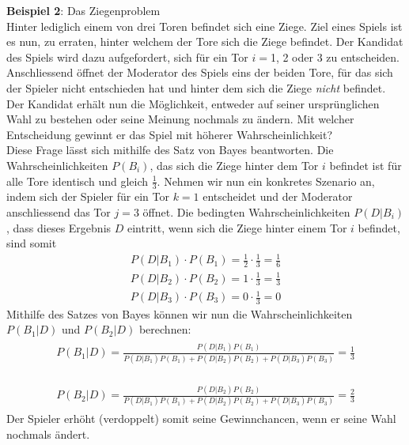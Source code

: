 \begin{center}
\begin{tcolorbox}[enhanced,width=6in, drop fuzzy shadow southwest,
colframe=blue!50!black,colback=blue!01]
\textbf{Beispiel 2}: Das Ziegenproblem \\

Hinter lediglich einem von drei Toren befindet sich eine Ziege. Ziel eines Spiels ist es nun, zu erraten, hinter welchem der Tore sich die Ziege befindet. Der Kandidat des Spiels wird dazu aufgefordert, sich für ein Tor $i=$1, 2 oder 3 zu entscheiden. Anschliessend öffnet der Moderator des Spiels eins der beiden Tore, für das sich der Spieler nicht entschieden hat und hinter dem sich die Ziege \textit{nicht} befindet. Der Kandidat erhält nun die Möglichkeit, entweder auf seiner ursprünglichen Wahl zu bestehen oder seine Meinung nochmals zu ändern. Mit welcher Entscheidung gewinnt er das Spiel mit höherer Wahrscheinlichkeit? \\

Diese Frage lässt sich mithilfe des Satz von Bayes beantworten. Die Wahrscheinlichkeiten $P(B_i)$, das sich die Ziege hinter dem Tor $i$ befindet ist für alle Tore identisch und gleich $\frac{1}{3}$. Nehmen wir nun ein konkretes Szenario an, indem sich der Spieler für ein Tor $k=1$ entscheidet und der Moderator anschliessend das Tor $j=3$ öffnet. Die bedingten Wahrscheinlichkeiten $P(D|B_i)$, dass dieses Ergebnis $D$ eintritt, wenn sich die Ziege hinter einem Tor $i$ befindet, sind somit
\begin{align}
P(D|B_1)\cdot P(B_1) = \frac{1}{2} \cdot \frac{1}{3} = \frac{1}{6} 
\end{align}
\begin{align}
P(D|B_2)\cdot P(B_2) = 1 \cdot \frac{1}{3} = \frac{1}{3}
\end{align}
\begin{align}
P(D|B_3)\cdot P(B_3) = 0 \cdot \frac{1}{3} = 0
\end{align}
Mithilfe des Satzes von Bayes können wir nun die Wahrscheinlichkeiten $P(B_1|D)$ und $P(B_2|D)$ berechnen:
\begin{align}
\begin{split}
P(B_1|D) = \frac{P(D|B_1)P(B_1)}{P(D|B_1)P(B_1) + P(D|B_2)P(B_2) + P(D|B_3)P(B_3)} = \frac{1}{3}
\end{split}
\end{align}

\begin{align}
\begin{split}
P(B_2|D) = \frac{P(D|B_2)P(B_2)}{P(D|B_1)P(B_1) + P(D|B_2)P(B_2) + P(D|B_3)P(B_3)} = \frac{2}{3}
\end{split}
\end{align}
Der Spieler erhöht (verdoppelt) somit seine Gewinnchancen, wenn er seine Wahl nochmals ändert.
\end{tcolorbox}
\end{center}





